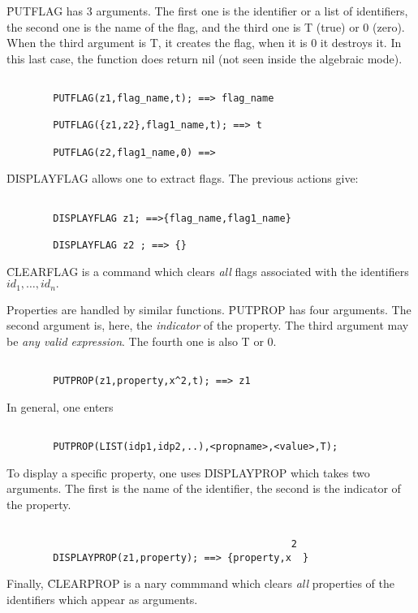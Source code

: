 \f{PUTFLAG} has 3 arguments. The first one is the identifier or a list
of identifiers, the second one is the name of the flag,
and the third one is T (true) or 0 (zero).
When the third argument is T, it creates the flag, when it is 0 it
destroys it. In this last case, the function does return nil (not seen 
inside the algebraic mode).
\begin{verbatim}

        PUTFLAG(z1,flag_name,t); ==> flag_name

        PUTFLAG({z1,z2},flag1_name,t); ==> t

        PUTFLAG(z2,flag1_name,0) ==>

\end{verbatim}
\f{DISPLAYFLAG} allows one to extract flags. The previous actions give:
\begin{verbatim}

        DISPLAYFLAG z1; ==>{flag_name,flag1_name}

        DISPLAYFLAG z2 ; ==> {}

\end{verbatim}
\f{CLEARFLAG} is a command which clears {\em all} flags associated with
the identifiers $id_1, \ldots , id_n .$
\item[ii.] Properties are handled by similar functions.
\f{PUTPROP} has four arguments. The second argument is, here, the
{\em indicator} of the property. The third argument may be {\em any
valid expression}. The fourth one is also T or 0.
\begin{verbatim}

        PUTPROP(z1,property,x^2,t); ==> z1

\end{verbatim}
In general, one enters
\begin{verbatim}

        PUTPROP(LIST(idp1,idp2,..),<propname>,<value>,T);

\end{verbatim}
To display a specific property, one uses
\f{DISPLAYPROP} which takes two arguments. The first is the name of the
identifier, the second is the indicator of the property.
\begin{verbatim}

                                                 2
        DISPLAYPROP(z1,property); ==> {property,x  }

\end{verbatim}
Finally, \f{CLEARPROP} is a nary commmand which clears {\em all}
properties of the identifiers which appear as arguments.
\ei
